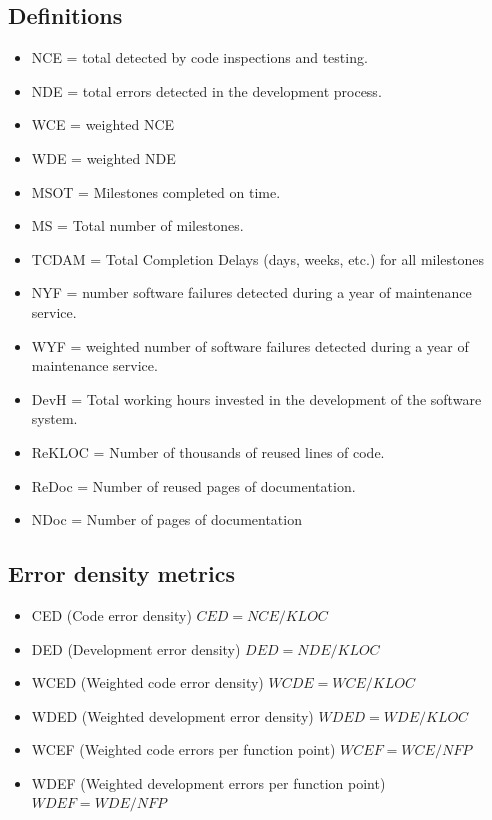 \documentclass{article}
\begin{document}
\subsection{Definitions}

\begin{itemize}
  \item NCE = total detected by code inspections and testing.
  \item NDE = total errors detected in the development process.
  \item WCE = weighted NCE
  \item WDE = weighted NDE
  \item MSOT = Milestones completed on time.
  \item MS = Total number of milestones.
  \item TCDAM = Total Completion Delays (days, weeks, etc.) for all milestones
  \item NYF = number software failures detected during a year of maintenance service.
  \item WYF = weighted number of software failures detected during a year of maintenance service.
  \item DevH = Total working hours invested in the development of the software system.
  \item ReKLOC = Number of thousands of reused lines of code.
  \item ReDoc = Number of reused pages of documentation.
  \item NDoc = Number of pages of documentation
\end{itemize}

\subsection{Error density metrics}

\begin{itemize}  
  \item CED (Code error density) $CED = NCE / KLOC$
  \item DED (Development error density) $DED = NDE /KLOC $
  \item WCED (Weighted code error density) $WCDE = WCE / KLOC$
  \item WDED (Weighted development error density) $WDED = WDE / KLOC$
  \item WCEF (Weighted code errors per function point) $WCEF = WCE / NFP $
  \item WDEF (Weighted development errors per function point) $WDEF = WDE / NFP$
\end{itemize}
\end{document}
